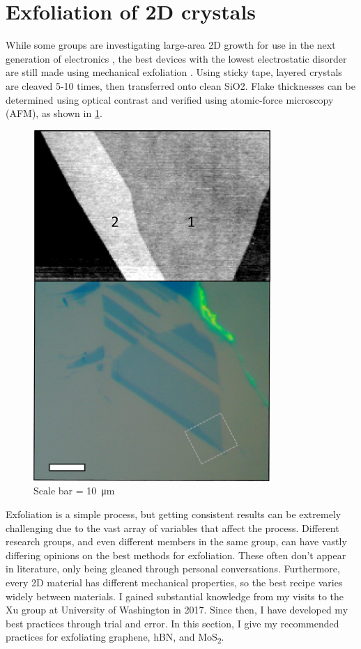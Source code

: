 \documentclass[double,12pt,1in]{beavtex}
\begin{document}
\section{Exfoliation of 2D crystals}

While some groups are investigating large-area 2D growth for use in the next generation of electronics \cite{quellmalz_large-area_2021}, the best devices with the lowest electrostatic disorder are still made using mechanical exfoliation \cite{xin_giant_2023}. Using sticky tape, layered crystals are cleaved 5-10 times, then transferred onto clean SiO2. Flake thicknesses can be determined using optical contrast and verified using atomic-force microscopy (AFM), as shown in \ref*{fig:graphenelayer}.

\begin{figure}[ht!]
    \centering
    \includegraphics[width = 9cm]{graphene layer comparison.png}
    \caption{Scale bar = \SI{10}{\micro\meter}}
    \label{fig:graphenelayer}
    
\end{figure}

Exfoliation is a simple process, but getting consistent results can be extremely challenging due to the vast array of variables that affect the process. Different research groups, and even different members in the same group, can have vastly differing opinions on the best methods for exfoliation. These often don’t appear in literature, only being gleaned through personal conversations. Furthermore, every 2D material has different mechanical properties, so the best recipe varies widely between materials. I gained substantial knowledge from my visits to the Xu group at University of Washington in 2017. Since then, I have developed my best practices through trial and error. In this section, I give my recommended practices for exfoliating graphene, hBN, and MoS\textsubscript{2}.
\end{document}
